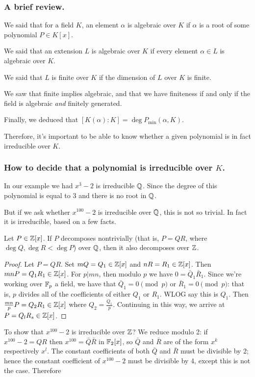 \subsubsection*{A brief review.}
We said that for a field $K$, an element $\alpha$ is algebraic over $K$ if $\alpha$ is a root of some polynomial $P \in K[x]$. 

We said that an extension $L$ is algebraic over $K$ if every element $\alpha \in L$ is algebraic over $K$. 

We said that $L$ is finite over $K$ if the dimension of $L$ over $K$ is finite.

We saw that finite implies algebraic, and that we have finiteness if and only if the field is algebraic \emph{and} finitely generated.

Finally, we deduced that $[K(\alpha):K] = \deg P_{\min}(\alpha, K)$.

Therefore, it's important to be able to know whether a given polynomial is in fact irreducible over $K$.

\subsubsection*{How to decide that a polynomial is irreducible over $K$.}
In our example we had $x^3 - 2$ is irreducible $\mathbb{Q}$. Since the degree of this polynomial is equal to 3 and there is no root in $\mathbb{Q}$.

But if we ask whether $x^{100} - 2$ is irreducible over $\mathbb{Q}$, this is not so trivial. In fact it is irreducible, based on a few facts.

\begin{lem}[Gauss]
Let $P \in \mathbb{Z}[x]$. If $P$ decomposes nontrivially (that is, $P = QR$, where $\deg Q, \deg R < \deg P$) over $\mathbb{Q}$, then it also decomposes over $\mathbb{Z}$.
\end{lem}
\begin{proof}
Let $P = QR$. Set $m Q = Q_1 \in \mathbb{Z}[x]$ and $n R = R_1 \in \mathbb{Z}[x]$. Then $mn P = Q_1 R_1 \in \mathbb{Z}[x]$. For $p | mn$, then modulo $p$ we have $0 = \bar{Q}_1 \bar{R}_1$. Since we're working over $\mathbb{F}_p$ a field, we have that $\bar{Q}_1 = 0 \pmod p$ or $\bar{R}_1 = 0 \pmod p$: that is, $p$ divides all of the coefficients of either $Q_1$ or $R_1$. WLOG say this is $Q_1$. Then $\frac{mn}{p} P = Q_2 R_1 \in \mathbb{Z}[x]$ where $Q_2 = \frac{Q_1}{p}$. Continuing in this way, we arrive at $P = Q_l R_s \in \mathbb{Z}[x]$.
\end{proof}
\begin{ex}
To show that $x^{100} - 2$ is irreducible over $\mathbb{Z}$? We reduce modulo 2: if $x^{100} - 2 = QR$ then $x^{100} = \bar{Q} \bar{R}$ in $\mathbb{F}_2[x]$, so $\bar{Q}$ and $\bar{R}$ are of the form $x^k$ respectively $x^l$. The constant coefficients of both $\bar{Q}$ and $\bar{R}$ must be divisible by 2; hence the constant coefficient of $x^{100} - 2$ must be divisible by 4, except this is not the case. Therefore 
\end{ex}


